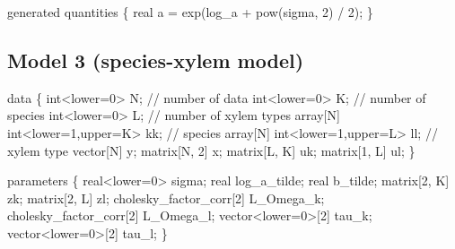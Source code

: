\documentclass[
  12pt,
  letterpaper,
  DIV=11,
  numbers=noendperiod]{scrartcl}
\newenvironment{Shaded}{\begin{snugshade}}{\end{snugshade}}
\newcommand{\CommentTok}[1]{\textcolor[rgb]{0.37,0.37,0.37}{#1}}
\newcommand{\DataTypeTok}[1]{\textcolor[rgb]{0.68,0.00,0.00}{#1}}
\newcommand{\DecValTok}[1]{\textcolor[rgb]{0.68,0.00,0.00}{#1}}
\newcommand{\KeywordTok}[1]{\textcolor[rgb]{0.00,0.23,0.31}{#1}}
\newcommand{\NormalTok}[1]{\textcolor[rgb]{0.00,0.23,0.31}{#1}}
\begin{document}
\begin{Shaded}
\begin{Highlighting}[]
\KeywordTok{generated quantities}\NormalTok{ \{}
  \DataTypeTok{real}\NormalTok{ a = exp(log\_a + pow(sigma, }\DecValTok{2}\NormalTok{) / }\DecValTok{2}\NormalTok{);}
\NormalTok{\}}
\end{Highlighting}
\end{Shaded}

\newpage

\subsection{Model 3 (species-xylem
model)}\label{model-3-species-xylem-model}

\begin{Shaded}
\begin{Highlighting}[]
\KeywordTok{data}\NormalTok{ \{}
  \DataTypeTok{int}\NormalTok{\textless{}}\KeywordTok{lower}\NormalTok{=}\DecValTok{0}\NormalTok{\textgreater{} N; }\CommentTok{// number of data}
  \DataTypeTok{int}\NormalTok{\textless{}}\KeywordTok{lower}\NormalTok{=}\DecValTok{0}\NormalTok{\textgreater{} K; }\CommentTok{// number of species}
  \DataTypeTok{int}\NormalTok{\textless{}}\KeywordTok{lower}\NormalTok{=}\DecValTok{0}\NormalTok{\textgreater{} L; }\CommentTok{// number of xylem types}
  \DataTypeTok{array}\NormalTok{[N] }\DataTypeTok{int}\NormalTok{\textless{}}\KeywordTok{lower}\NormalTok{=}\DecValTok{1}\NormalTok{,}\KeywordTok{upper}\NormalTok{=K\textgreater{} kk; }\CommentTok{// species}
  \DataTypeTok{array}\NormalTok{[N] }\DataTypeTok{int}\NormalTok{\textless{}}\KeywordTok{lower}\NormalTok{=}\DecValTok{1}\NormalTok{,}\KeywordTok{upper}\NormalTok{=L\textgreater{} ll; }\CommentTok{// xylem type}
  \DataTypeTok{vector}\NormalTok{[N] y;}
  \DataTypeTok{matrix}\NormalTok{[N, }\DecValTok{2}\NormalTok{] x;}
  \DataTypeTok{matrix}\NormalTok{[L, K] uk;}
  \DataTypeTok{matrix}\NormalTok{[}\DecValTok{1}\NormalTok{, L] ul;}
\NormalTok{\}}

\KeywordTok{parameters}\NormalTok{ \{}
  \DataTypeTok{real}\NormalTok{\textless{}}\KeywordTok{lower}\NormalTok{=}\DecValTok{0}\NormalTok{\textgreater{} sigma;}
  \DataTypeTok{real}\NormalTok{ log\_a\_tilde;}
  \DataTypeTok{real}\NormalTok{ b\_tilde;}
  \DataTypeTok{matrix}\NormalTok{[}\DecValTok{2}\NormalTok{, K] zk;}
  \DataTypeTok{matrix}\NormalTok{[}\DecValTok{2}\NormalTok{, L] zl;}
  \DataTypeTok{cholesky\_factor\_corr}\NormalTok{[}\DecValTok{2}\NormalTok{] L\_Omega\_k;}
  \DataTypeTok{cholesky\_factor\_corr}\NormalTok{[}\DecValTok{2}\NormalTok{] L\_Omega\_l;}
  \DataTypeTok{vector}\NormalTok{\textless{}}\KeywordTok{lower}\NormalTok{=}\DecValTok{0}\NormalTok{\textgreater{}[}\DecValTok{2}\NormalTok{] tau\_k;}
  \DataTypeTok{vector}\NormalTok{\textless{}}\KeywordTok{lower}\NormalTok{=}\DecValTok{0}\NormalTok{\textgreater{}[}\DecValTok{2}\NormalTok{] tau\_l;}
\NormalTok{\}}


\end{Highlighting}
\end{Shaded}
\end{document}

